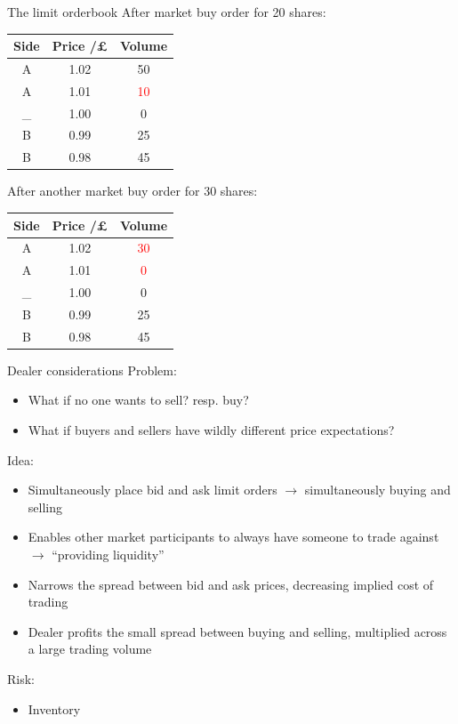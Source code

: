 \documentclass{beamer} %
\begin{document}
\begin{frame}{The limit orderbook}
    After market buy order for 20 shares:
    \begin{center}
        \begin{tabular}{ |c|c|c| } 
            \hline
            Side & Price /£ & Volume \\ 
            \hline
            A & 1.02 & 50 \\
            A & 1.01 & \textcolor{red}{10} \\
            \_ & 1.00 & 0 \\
            B & 0.99 & 25 \\ 
            B & 0.98 & 45 \\
            \hline
        \end{tabular}
    \end{center}
    After another market buy order for 30 shares:
    \begin{center}
        \begin{tabular}{ |c|c|c| } 
            \hline
            Side & Price /£ & Volume \\ 
            \hline
            A & 1.02 & \textcolor{red}{30} \\
            A & 1.01 & \textcolor{red}{0} \\
            \_ & 1.00 & 0 \\
            B & 0.99 & 25 \\ 
            B & 0.98 & 45 \\
            \hline
        \end{tabular}
    \end{center}
\end{frame}

\begin{frame}{Dealer considerations}
    Problem:
    \begin{itemize}
        \item What if no one wants to sell? resp. buy?
        \item What if buyers and sellers have wildly different price expectations?
    \end{itemize}
    Idea:
    \begin{itemize}
        \item Simultaneously place bid and ask limit orders $\rightarrow$ simultaneously buying and selling
        \item Enables other market participants to always have someone to trade against $\rightarrow$ ``providing liquidity''
        \item Narrows the spread between bid and ask prices, decreasing implied cost of trading
        \item Dealer profits the small spread between buying and selling, multiplied across a large trading volume
    \end{itemize}
    Risk:
    \begin{itemize}
        \item Inventory
    \end{itemize}
\end{frame}
\end{document}

